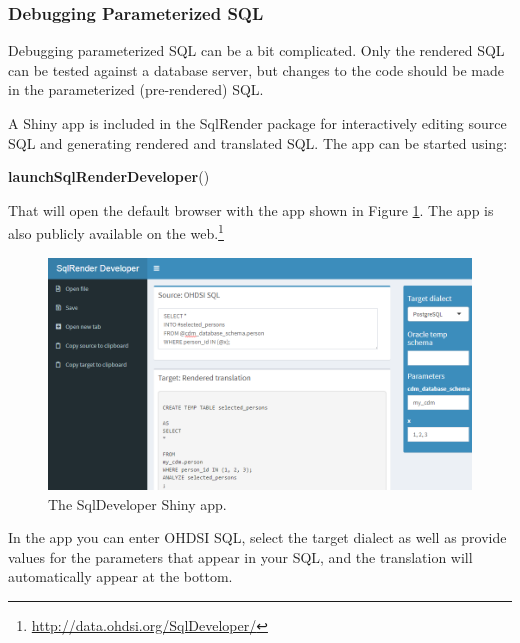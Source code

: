 \documentclass[11pt]{book}
\newenvironment{Shaded}{\begin{snugshade}}{\end{snugshade}}
\newcommand{\KeywordTok}[1]{\textcolor[rgb]{0.13,0.29,0.53}{\textbf{#1}}}
\newcommand{\NormalTok}[1]{#1}
\let\rmarkdownfootnote\footnote%
\def\footnote{\protect\rmarkdownfootnote}
\theoremstyle{definition}
\theoremstyle{definition}
\theoremstyle{definition}
\theoremstyle{remark}
\begin{document}
\subsubsection*{Debugging Parameterized
SQL}\label{debugging-parameterized-sql}

Debugging parameterized SQL can be a bit complicated. Only the rendered
SQL can be tested against a database server, but changes to the code
should be made in the parameterized (pre-rendered) SQL.

A Shiny app is included in the SqlRender package for interactively
editing source SQL and generating rendered and translated SQL. The app
can be started using:

\begin{Shaded}
\begin{Highlighting}[]
\KeywordTok{launchSqlRenderDeveloper}\NormalTok{()}
\end{Highlighting}
\end{Shaded}

That will open the default browser with the app shown in Figure
\ref{fig:sqlDeveloper}. The app is also publicly available on the
web.\footnote{\url{http://data.ohdsi.org/SqlDeveloper/}}

\begin{figure}

{\centering \includegraphics[width=1\linewidth]{images/SqlAndR/sqlDeveloper} 

}

\caption{The SqlDeveloper Shiny app.}\label{fig:sqlDeveloper}
\end{figure}

In the app you can enter OHDSI SQL, select the target dialect as well as
provide values for the parameters that appear in your SQL, and the
translation will automatically appear at the bottom.
\end{document}

